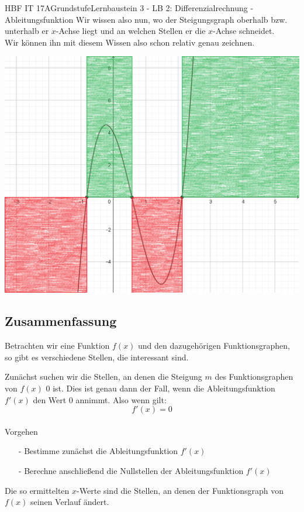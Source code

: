 \documentclass[11pt,twocolumn,oneside,openany,headings=optiontotoc,11pt,numbers=noenddot]{article}
\begin{document}
\begin{worksheet}{HBF IT 17A}{Grundstufe}{Lernbaustein 3 - LB 2: Differenzialrechnung - Ableitungsfunktion}
		Wir wissen also nun, wo der Steigungsgraph oberhalb bzw. unterhalb er \(x\)-Achse liegt und an welchen Stellen er die \(x\)-Achse schneidet.\\
		Wir können ihn mit diesem Wissen also schon relativ genau zeichnen.\\
		\par\noindent
		\includegraphics[scale=0.25]{Bilder/f'Absch.png}
		\subsection{Zusammenfassung}
		Betrachten wir eine Funktion \(f(x)\) und den dazugehörigen Funktionsgraphen, so gibt es verschiedene Stellen, die interessant sind.
		\begin{framed}
			\noindent
			Zunächst suchen wir die Stellen, an denen die Steigung \(m\) des Funktionsgraphen von \(f(x)\) 0 ist. Dies ist genau dann der Fall, wenn die Ableitungsfunktion \(f'(x)\) den Wert 0 annimmt. Also wenn gilt: \[f'(x) = 0\]\\
			\tiny{\color{codegray}Vorgehen}\normalsize
			\begin{itemize}
				\item[-] Bestimme zunächst die Ableitungsfunktion \(f'(x)\)
				\item[-] Berechne anschließend die Nullstellen der Ableitungsfunktion \(f'(x)\)
			\end{itemize}
			Die so ermittelten \(x\)-Werte sind die Stellen, an denen der Funktionsgraph von \(f(x)\) seinen Verlauf ändert.
		\end{framed}
		
	\end{worksheet}
\end{document}
